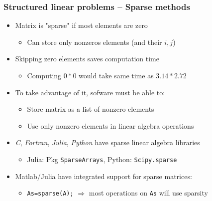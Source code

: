 \documentclass[bigger]{beamer}
\begin{document}
\begin{frame}%

\frametitle{Structured linear problems -- Sparse methods}

\begin{itemize}
\item Matrix is "sparse" if most elements are zero

\begin{itemize}
\item Can store only nonzeros elements (and their $i,j$)
\end{itemize}

\item Skipping zero elements saves computation time

\begin{itemize}
\item Computing $0\ast 0$ would take same time as $3.14\ast 2.72$
\end{itemize}

\item To take advantage of it, sofware must be able to:

\begin{itemize}
\item Store matrix as a list of nonzero elements

\item Use only nonzero elements in linear algebra operations
\end{itemize}

\item \emph{C}, \emph{Fortran}, \emph{Julia}, \emph{Python} have sparse linear algebra libraries
\begin{itemize}
\item Julia: Pkg \texttt{SparseArrays}, Python: \texttt{Scipy.sparse}
\end{itemize}
	

\item Matlab/Julia have integrated support for sparse matrices:

\begin{itemize}
\item \texttt{As=sparse(A);} $\Rightarrow $ most operations on \texttt{As}
will use sparsity
\end{itemize}


\end{itemize}


\end{frame}%
\end{document}
